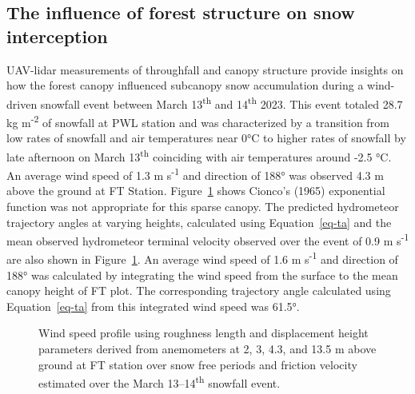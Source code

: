 \documentclass[
  letterpaper,
  DIV=11,
  numbers=noendperiod]{scrartcl}
\begin{document}
\subsection{The influence of forest structure on snow
interception}\label{the-influence-of-forest-structure-on-snow-interception}

UAV-lidar measurements of throughfall and canopy structure provide
insights on how the forest canopy influenced subcanopy snow accumulation
during a wind-driven snowfall event between March 13\textsuperscript{th}
and 14\textsuperscript{th} 2023. This event totaled 28.7 kg
m\textsuperscript{-2} of snowfall at PWL station and was characterized
by a transition from low rates of snowfall and air temperatures near 0°C
to higher rates of snowfall by late afternoon on March
13\textsuperscript{th} coinciding with air temperatures around -2.5 °C.
An average wind speed of 1.3 m s\textsuperscript{-1} and direction of
188° was observed 4.3 m above the ground at FT Station.
Figure~\ref{fig-wind-profiles} shows Cionco's (1965) exponential
function was not appropriate for this sparse canopy. The predicted
hydrometeor trajectory angles at varying heights, calculated using
Equation~\ref{eq-ta} and the mean observed hydrometeor terminal velocity
observed over the event of 0.9 m s\textsuperscript{-1} are also shown in
Figure~\ref{fig-wind-profiles}. An average wind speed of 1.6 m
s\textsuperscript{-1} and direction of 188° was calculated by
integrating the wind speed from the surface to the mean canopy height of
FT plot. The corresponding trajectory angle calculated using
Equation~\ref{eq-ta} from this integrated wind speed was 61.5°.

\begin{figure}[H]


\caption{\label{fig-wind-profiles}Wind speed profile using roughness
length and displacement height parameters derived from anemometers at 2,
3, 4.3, and 13.5 m above ground at FT station over snow free periods and
friction velocity estimated over the March 13--14\textsuperscript{th}
snowfall event.}

\end{figure}%
\end{document}
